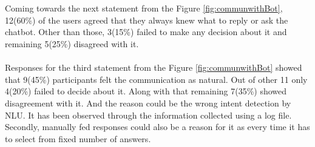\\~\\
Coming towards the next statement from the Figure \ref{fig:communwithBot}, 12(60\%) of the users agreed that they always knew what to reply or ask the chatbot. Other than those, 3(15\%) failed to make any decision about it and remaining 5(25\%) disagreed with it. 
\\~\\
Responses for the third statement from the Figure \ref{fig:communwithBot} showed that 9(45\%) participants felt the communication as natural. Out of other 11 only 4(20\%) failed to decide about it. Along with that remaining 7(35\%) showed disagreement with it. And the reason could be the wrong intent detection by NLU. It has been observed through the information collected using a log file. Secondly, manually fed responses could also be a reason for it as every time it has to select from fixed number of answers.

